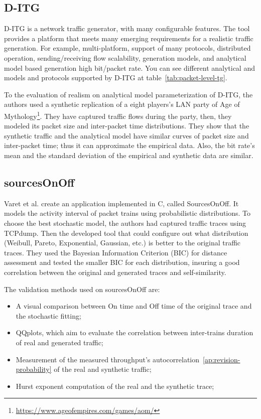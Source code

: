\subsection{D-ITG}


D-ITG\cite{ditg-paper} is a network traffic generator, with many configurable features. The tool provides a platform that meets many emerging requirements for a realistic traffic generation. For example, multi-platform, support of many protocols, distributed operation, sending/receiving flow scalability, generation models, and analytical model based generation high bit/packet rate. You can see different analytical and models and protocols supported by D-ITG at table~\ref{tab:packet-level-tg}.

To the evaluation of realism on analytical model parameterization of D-ITG, the authors used a synthetic replication of a eight players's LAN party of Age of Mythology\footnote{\href{https://www.ageofempires.com/games/aom/}{https://www.ageofempires.com/games/aom/}}. They have captured traffic flows during the party,  then, they modeled its packet size and inter-packet time distributions. They show that the synthetic traffic and the analytical model have similar curves of packet size and inter-packet time; thus it can approximate the empirical data. Also, the bit rate's mean and the standard deviation of the empirical and synthetic data are similar.

\subsection{sourcesOnOff}

Varet et al.\cite{sourcesonoff-paper} create an application implemented in C, called SourcesOnOff. It models the activity interval of packet trains using probabilistic distributions. To choose the best stochastic model, the authors had captured traffic traces using TCPdump. Then the developed tool that could configure out what distribution (Weibull, Pareto, Exponential, Gaussian, etc.) is better to the original traffic traces. They used the Bayesian Information Criterion (BIC) for distance assessment and tested the smaller BIC for each distribution, insuring a good correlation between the original and generated traces and self-similarity.  

The validation methods used on sourcesOnOff are:

\begin{itemize}
\item A visual comparison between On time and Off time of the original trace and the stochastic fitting;
\item QQplots, which aim to evaluate the correlation between inter-trains duration of real and generated traffic;
\item Measurement of the measured throughput's autocorrelation~\ref{ap:revision-probability} of the real and synthetic traffic;
\item Hurst exponent computation of the real and the synthetic trace;
\end{itemize}

